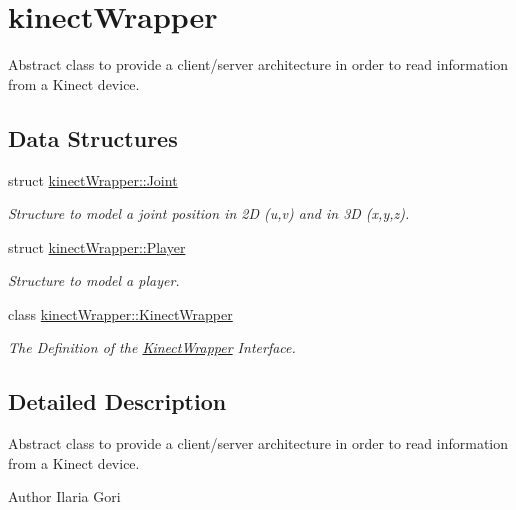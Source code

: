 \section{kinect\+Wrapper}
\label{group__kinectWrapper}


Abstract class to provide a client/server architecture in order to read information from a Kinect device.  


\subsection*{Data Structures}
\begin{DoxyCompactItemize}
\item 
struct \hyperlink{structkinectWrapper_1_1Joint}{kinect\+Wrapper\+::\+Joint}
\begin{DoxyCompactList}\small\item\em Structure to model a joint position in 2\+D (u,v) and in 3\+D (x,y,z). \end{DoxyCompactList}\item 
struct \hyperlink{structkinectWrapper_1_1Player}{kinect\+Wrapper\+::\+Player}
\begin{DoxyCompactList}\small\item\em Structure to model a player. \end{DoxyCompactList}\item 
class \hyperlink{classkinectWrapper_1_1KinectWrapper}{kinect\+Wrapper\+::\+Kinect\+Wrapper}
\begin{DoxyCompactList}\small\item\em The Definition of the \hyperlink{classkinectWrapper_1_1KinectWrapper}{Kinect\+Wrapper} Interface. \end{DoxyCompactList}\end{DoxyCompactItemize}


\subsection{Detailed Description}
Abstract class to provide a client/server architecture in order to read information from a Kinect device. 

\begin{DoxyAuthor}{Author}
Ilaria Gori 
\end{DoxyAuthor}
